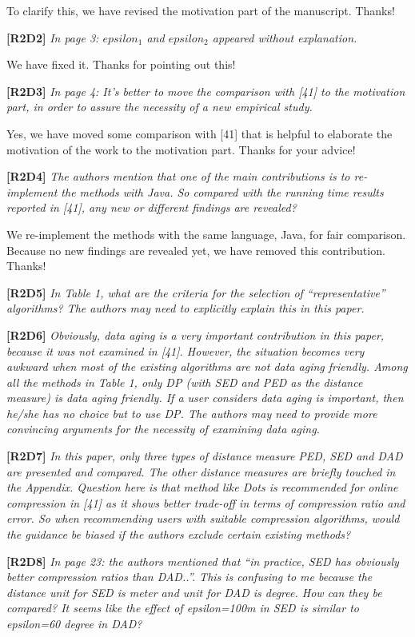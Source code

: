 \documentclass{letter}
\begin{document}
To clarify this, we have revised the motivation part of the manuscript. Thanks!

\textbf{[R2D2]} \emph{In page 3: $epsilon_1$ and $epsilon_2$ appeared without explanation.}

We have fixed it. Thanks for pointing out this!

\textbf{[R2D3]} \emph{ In page 4: It’s better to move the comparison with [41] to the motivation part, in order to assure the necessity of a new empirical study.}

Yes, we have moved some comparison with [41] that is helpful to elaborate the motivation of the work to the motivation part. Thanks for your advice!

\textbf{[R2D4]} \emph{The authors mention that one of the main contributions is to re-implement the methods with Java. So compared with the running time results reported in [41], any new or different findings are revealed?}

We re-implement the methods with the same language, Java, for fair comparison. Because no new findings are revealed yet, we have removed this contribution. Thanks!


\textbf{[R2D5]} \emph{In Table 1, what are the criteria for the selection of “representative” algorithms? The authors may need to explicitly explain this in this paper.}

\textbf{[R2D6]} \emph{Obviously, data aging is a very important contribution in this paper, because it was not examined in [41]. However, the situation becomes very awkward when most of the existing algorithms are not data aging friendly. Among all the methods in Table 1, only DP (with SED and PED as the distance measure) is data aging friendly. If a user considers data aging is important, then he/she has no choice but to use DP. The authors may need to provide more convincing arguments for the necessity of examining data aging.}


\textbf{[R2D7]} \emph{In this paper, only three types of distance measure PED, SED and DAD are presented and compared. The other distance measures are briefly touched in the Appendix. Question here is that method like Dots is recommended for online compression in [41] as it shows better trade-off in terms of compression ratio and error. So when recommending users with suitable compression algorithms, would the guidance be biased if the authors exclude certain existing methods?}

\textbf{[R2D8]} \emph{In page 23: the authors mentioned that “in practice, SED has obviously better compression ratios than DAD..”. This is confusing to me because the distance unit for SED is meter and unit for DAD is degree. How can they be compared? It seems like the effect of epsilon=100m in SED is similar to epsilon=60 degree in DAD?}
\end{document}

